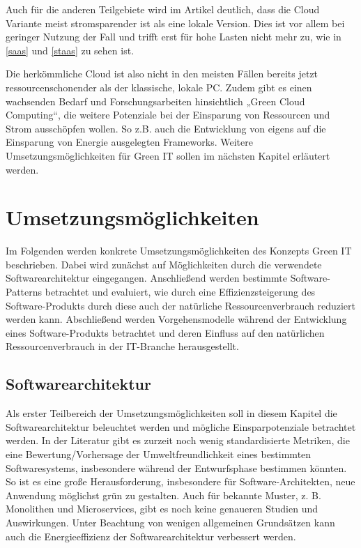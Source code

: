 \documentclass[utf8,biblatex]{lni}
\begin{document}
Auch für die anderen Teilgebiete wird im Artikel deutlich, dass die Cloud Variante meist stromsparender ist als eine lokale Version. Dies ist vor allem bei geringer Nutzung der Fall und trifft erst für hohe Lasten nicht mehr zu, wie in \autoref{saas} und \autoref{staas} zu sehen ist. \cite{Baliga11}

Die herkömmliche Cloud ist also nicht in den meisten Fällen bereits jetzt ressourcenschonender als der klassische, lokale PC. Zudem gibt es einen wachsenden Bedarf und Forschungsarbeiten hinsichtlich „Green Cloud Computing“, die weitere Potenziale bei der Einsparung von Ressourcen und Strom ausschöpfen wollen. So z.B. auch die Entwicklung von eigens auf die Einsparung von Energie ausgelegten Frameworks. \cite{Chauhan13} Weitere Umsetzungsmöglichkeiten für Green IT sollen im nächsten Kapitel erläutert werden.


\section{Umsetzungsmöglichkeiten}
\label{Umsetzung}
Im Folgenden werden konkrete Umsetzungsmöglichkeiten des Konzepts Green IT beschrieben. Dabei wird zunächst auf Möglichkeiten durch die verwendete Softwarearchitektur eingegangen. Anschließend werden bestimmte Software-Patterns betrachtet und evaluiert, wie durch eine Effizienzsteigerung des Software-Produkts durch diese auch der natürliche Ressourcenverbrauch reduziert werden kann. Abschließend werden Vorgehensmodelle während der Entwicklung eines Software-Produkts betrachtet und deren Einfluss auf den natürlichen Ressourcenverbrauch in der IT-Branche herausgestellt.  

\subsection{Softwarearchitektur}
\label{SWA}
Als erster Teilbereich der Umsetzungsmöglichkeiten soll in diesem Kapitel die Softwarearchitektur beleuchtet werden und mögliche Einsparpotenziale betrachtet werden. In der Literatur gibt es zurzeit noch wenig standardisierte Metriken, die eine Bewertung/Vorhersage der Umweltfreundlichkeit eines bestimmten Softwaresystems, insbesondere während der Entwurfsphase bestimmen könnten. So ist es eine große Herausforderung, insbesondere für Software-Architekten, neue Anwendung möglichst grün zu gestalten. \cite{Mehra22} Auch für bekannte Muster, z. B. Monolithen und Microservices, gibt es noch keine genaueren Studien und Auswirkungen. Unter Beachtung von wenigen allgemeinen Grundsätzen kann auch die Energieeffizienz der Softwarearchitektur verbessert werden.
\end{document}
